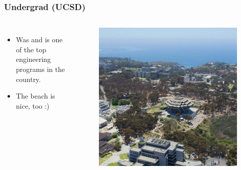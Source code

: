 \documentclass[aspectratio=169]{beamer}
\begin{document}
\begin{frame}
  \frametitle{Undergrad (UCSD)}
  \begin{columns}[t]            %
  \begin{itemize}
  \item Was and is one of the top engineering programs in the country.
  \item The beach is nice, too :)
  \end{itemize}

  \begin{figure}
    \includegraphics[width=0.7\linewidth]{UCSD.jpg}
  \end{figure}
  \end{columns}
\end{frame}
\end{document}
